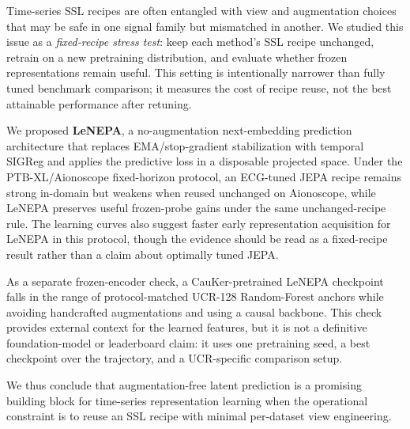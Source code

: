 \documentclass[sigconf,anonymous,review]{acmart}
\begin{document}
Time-series SSL recipes are often entangled with view and augmentation choices that may be safe in one signal family but mismatched in another.
We studied this issue as a \emph{fixed-recipe stress test}: keep each method's SSL recipe unchanged, retrain on a new pretraining distribution, and evaluate whether frozen representations remain useful.
This setting is intentionally narrower than fully tuned benchmark comparison; it measures the cost of recipe reuse, not the best attainable performance after retuning.

We proposed \textbf{LeNEPA}, a no-augmentation next-embedding prediction architecture that replaces EMA/stop-gradient stabilization with temporal SIGReg and applies the predictive loss in a disposable projected space.
Under the PTB-XL/Aionoscope fixed-horizon protocol, an ECG-tuned JEPA recipe remains strong in-domain but weakens when reused unchanged on Aionoscope, while LeNEPA preserves useful frozen-probe gains under the same unchanged-recipe rule.
The learning curves also suggest faster early representation acquisition for LeNEPA in this protocol, though the evidence should be read as a fixed-recipe result rather than a claim about optimally tuned JEPA.

As a separate frozen-encoder check, a CauKer-pretrained LeNEPA checkpoint falls in the range of protocol-matched UCR-128 Random-Forest anchors while avoiding handcrafted augmentations and using a causal backbone.
This check provides external context for the learned features, but it is not a definitive foundation-model or leaderboard claim: it uses one pretraining seed, a best checkpoint over the trajectory, and a UCR-specific comparison setup.

We thus conclude that augmentation-free latent prediction is a promising building block for time-series representation learning when the operational constraint is to reuse an SSL recipe with minimal per-dataset view engineering.




%
\end{document}

